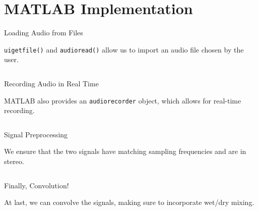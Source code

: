 \section{MATLAB Implementation}


\begin{frame}[fragile]{Loading Audio from Files}

    \texttt{uigetfile()} and \texttt{audioread()} allow us to import an audio file chosen by the user.

    \inputminted[firstline=8,lastline=15]{matlab}{../../effect/convolution_playback.m}

\end{frame}


\begin{frame}[fragile]{Recording Audio in Real Time}

    MATLAB also provides an \texttt{audiorecorder} object, which allows for real-time recording.

    \inputminted[firstline=26,lastline=34]{matlab}{../../effect/convolution_playback.m}

\end{frame}


\begin{frame}[fragile]{Signal Preprocessing}

    We ensure that the two signals have matching sampling frequencies and are in stereo.

    \inputminted[firstline=36,lastline=43]{matlab}{../../effect/convolution_playback.m}

\end{frame}


\begin{frame}[fragile]{Finally, Convolution!}

    At last, we can convolve the signals, making sure to incorporate wet/dry mixing.

    \inputminted[firstline=45,lastline=53,fontsize=\footnotesize]{matlab}{../../effect/convolution_playback.m}

\end{frame}
